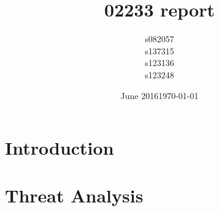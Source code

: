\documentclass[11pt]{article}
\title{02233 report}
\author{s082057\\s137315\\s123136\\s123248}
\date{June 2016}
\date{\today}
\begin{document}


\tableofcontents

\section{Introduction}


\section{Threat Analysis}


{}

\end{document}
